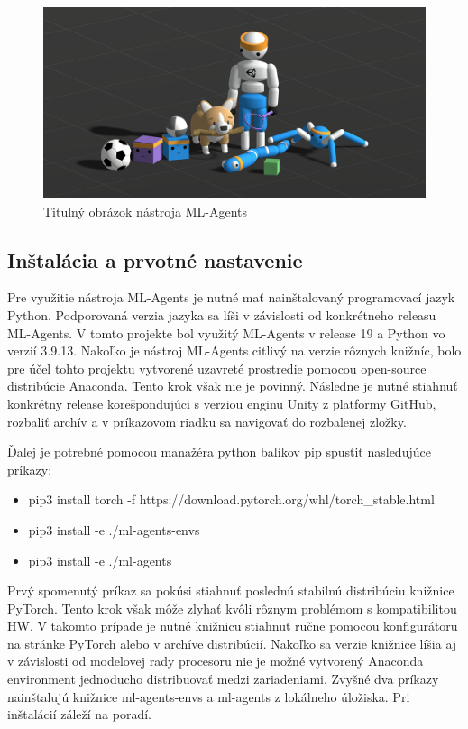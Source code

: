 \documentclass[slovak, master]{diploma}
\begin{document}
\begin{figure}[!htbp]
    \centering
    \includegraphics[width=.9\textwidth]{Figures/mlagents.png}
    \caption{Titulný obrázok nástroja ML-Agents \cite{mlagentsWeb}}
    \label{pic:mlagetnsLogo}
\end{figure}

\subsection{Inštalácia a prvotné nastavenie}
\label{sec:MLAgentsInstall}
Pre využitie nástroja ML-Agents je nutné mať nainštalovaný programovací jazyk Python. Podporovaná verzia jazyka sa líši v závislosti od konkrétneho releasu ML-Agents. V tomto projekte bol využitý ML-Agents v release 19 a Python vo verzií 3.9.13. Nakoľko je nástroj ML-Agents citlivý na verzie rôznych knižníc, bolo pre účel tohto projektu vytvorené uzavreté prostredie pomocou open-source distribúcie Anaconda. Tento krok však nie je povinný. Následne je nutné stiahnuť konkrétny release korešpondujúci s verziou enginu Unity z platformy GitHub, rozbaliť archív a v príkazovom riadku sa navigovať do rozbalenej zložky.

Ďalej je potrebné pomocou manažéra python balíkov pip spustiť nasledujúce príkazy:
\begin{itemize}
  \item pip3 install torch -f https://download.pytorch.org/whl/torch\_stable.html
  \item pip3 install -e ./ml-agents-envs
  \item pip3 install -e ./ml-agents
\end{itemize}

Prvý spomenutý príkaz sa pokúsi stiahnuť poslednú stabilnú distribúciu knižnice PyTorch. Tento krok však môže zlyhať kvôli rôznym problémom s kompatibilitou HW. V takomto prípade je nutné knižnicu stiahnuť ručne pomocou konfigurátoru na stránke PyTorch alebo v archíve distribúcií. Nakoľko sa verzie knižnice líšia aj v závislosti od modelovej rady procesoru nie je možné vytvorený Anaconda environment jednoducho distribuovať medzi zariadeniami. Zvyšné dva príkazy nainštalujú knižnice ml-agents-envs a ml-agents z lokálneho úložiska. Pri inštalácií záleží na poradí.
\end{document}
